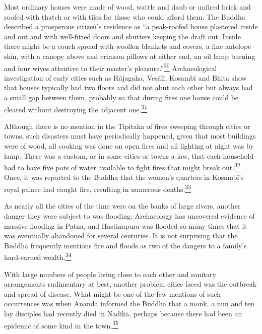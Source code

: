 Most ordinary houses were made of wood, wattle and daub or unfired brick
and roofed with thatch or with tiles for those who could afford them.
The Buddha described a prosperous citizen's residence as ``a peak-roofed
house plastered inside and out and with well-fitted doors and shutters
keeping the draft out. Inside there might be a couch spread with woollen
blankets and covers, a fine antelope skin, with a canopy above and
crimson pillows at either end, an oil lamp burning and four wives
attentive to their master's
pleasure.''\label{footprints_split_006.html_fnref30}\hyperref[footprints_split_024.htmlux5cux23fn30]{\textsuperscript{30}}
Archaeological investigation of early cities such as Rājagaha, Vesālī,
Kosambī and Bhita show that houses typically had two floors and did not
abut each other but always had a small gap between them, probably so
that during fires one house could be cleared without destroying the
adjacent
one.\label{footprints_split_006.html_fnref31}\hyperref[footprints_split_024.htmlux5cux23fn31]{\textsuperscript{31}}

Although there is no mention in the Tipitaka of fires sweeping through
cities or towns, such disasters must have periodically happened, given
that most buildings were of wood, all cooking was done on open fires and
all lighting at night was by lamp. There was a custom, or in some cities
or towns a law, that each household had to have five pots of water
available to fight fires that might break
out.\label{footprints_split_006.html_fnref32}\hyperref[footprints_split_024.htmlux5cux23fn32]{\textsuperscript{32}}
Once, it was reported to the Buddha that the women's quarters in
Kosambī's royal palace had caught fire, resulting in numerous
deaths.\label{footprints_split_006.html_fnref33}\hyperref[footprints_split_024.htmlux5cux23fn33]{\textsuperscript{33}}

As nearly all the cities of the time were on the banks of large rivers,
another danger they were subject to was flooding. Archaeology has
uncovered evidence of massive flooding in Patna, and Hastinapura was
flooded so many times that it was eventually abandoned for several
centuries. It is not surprising that the Buddha frequently mentions fire
and floods as two of the dangers to a family's hard-earned
wealth.\label{footprints_split_006.html_fnref34}\hyperref[footprints_split_024.htmlux5cux23fn34]{\textsuperscript{34}}

With large numbers of people living close to each other and sanitary
arrangements rudimentary at best, another problem cities faced was the
outbreak and spread of disease. What might be one of the few mentions of
such occurrences was when Ānanda informed the Buddha that a monk, a nun
and ten lay disciples had recently died in Nādikā, perhaps because there
had been an epidemic of some kind in the
town.\label{footprints_split_006.html_fnref35}\hyperref[footprints_split_024.htmlux5cux23fn35]{\textsuperscript{35}}

